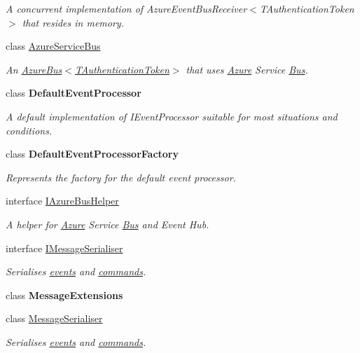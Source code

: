 \begin{DoxyCompactItemize}
\begin{DoxyCompactList}\small\item\em A concurrent implementation of Azure\+Event\+Bus\+Receiver$<$\+T\+Authentication\+Token$>$ that resides in memory. \end{DoxyCompactList}\item 
class \hyperlink{classCqrs_1_1Azure_1_1ServiceBus_1_1AzureServiceBus}{Azure\+Service\+Bus}
\begin{DoxyCompactList}\small\item\em An \hyperlink{classCqrs_1_1Azure_1_1ServiceBus_1_1AzureBus_a1046ff74282fd178f43e28420433d2a9_a1046ff74282fd178f43e28420433d2a9}{Azure\+Bus$<$\+T\+Authentication\+Token$>$} that uses \hyperlink{namespaceCqrs_1_1Azure}{Azure} Service \hyperlink{namespaceCqrs_1_1Bus}{Bus}. \end{DoxyCompactList}\item 
class {\bfseries Default\+Event\+Processor}
\begin{DoxyCompactList}\small\item\em A default implementation of I\+Event\+Processor suitable for most situations and conditions. \end{DoxyCompactList}\item 
class {\bfseries Default\+Event\+Processor\+Factory}
\begin{DoxyCompactList}\small\item\em Represents the factory for the default event processor. \end{DoxyCompactList}\item 
interface \hyperlink{interfaceCqrs_1_1Azure_1_1ServiceBus_1_1IAzureBusHelper}{I\+Azure\+Bus\+Helper}
\begin{DoxyCompactList}\small\item\em A helper for \hyperlink{namespaceCqrs_1_1Azure}{Azure} Service \hyperlink{namespaceCqrs_1_1Bus}{Bus} and Event Hub. \end{DoxyCompactList}\item 
interface \hyperlink{interfaceCqrs_1_1Azure_1_1ServiceBus_1_1IMessageSerialiser}{I\+Message\+Serialiser}
\begin{DoxyCompactList}\small\item\em Serialises \hyperlink{}{events} and \hyperlink{}{commands}. \end{DoxyCompactList}\item 
class {\bfseries Message\+Extensions}
\item 
class \hyperlink{classCqrs_1_1Azure_1_1ServiceBus_1_1MessageSerialiser}{Message\+Serialiser}
\begin{DoxyCompactList}\small\item\em Serialises \hyperlink{}{events} and \hyperlink{}{commands}. \end{DoxyCompactList}\end{DoxyCompactItemize}

